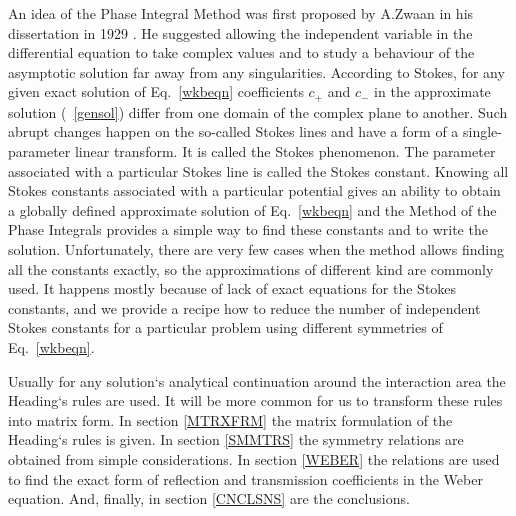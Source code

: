 \documentclass[aps,prl,preprint,superscriptaddress]{revtex4}
\begin{document}
An idea of the Phase Integral Method was first proposed by A.Zwaan in his dissertation in 1929 \cite{zwaan}. He suggested allowing the independent variable in the differential equation to take complex values and to study a behaviour of the asymptotic solution far away from any singularities. According to Stokes\cite{stokes}, for any given exact solution of Eq.~\ref{wkbeqn} coefficients $c_+$ and $c_-$ in the approximate solution (~\ref{gensol}) differ from one domain of the complex plane to another. Such abrupt changes happen on the so-called Stokes lines and have a form of a single-parameter linear transform\cite{heading}. It is called the Stokes phenomenon. The parameter associated with a particular Stokes line is called the Stokes constant. Knowing all Stokes constants associated with a particular potential gives an ability to obtain a globally defined approximate solution of Eq.~\ref{wkbeqn}\cite{heading,white} and the Method of the Phase Integrals provides a simple way to find these constants and to write the solution. Unfortunately, there are very few cases when the method allows finding all the constants exactly, so the approximations of different kind \cite{white,ours} are commonly used. It happens mostly because of lack of exact equations for the Stokes constants, and we provide a recipe how to reduce the number of independent Stokes constants for a particular problem using different symmetries of Eq.~\ref{wkbeqn}.

Usually for any solution`s analytical continuation around the interaction area the Heading`s rules \cite{white} are used. It will be more common for us to transform these rules into matrix form. 
In section \ref{MTRXFRM} the matrix formulation of the Heading`s rules is given. 
In section \ref{SMMTRS} the symmetry relations are obtained from simple considerations. 
In section \ref{WEBER} the relations are used to find the exact form of reflection and transmission coefficients in the Weber equation. 
And, finally, in section \ref{CNCLSNS} are the conclusions. 
\end{document}
